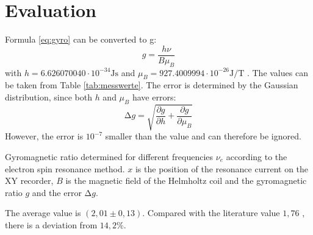 \section{Evaluation}
Formula \ref{eq:gyro} can be converted to g:
\begin{equation}
  g=\frac{h\nu}{B\mu_{B}}
\end{equation}
with $h=6.626070040\cdot10^{-34}\si{\joule\second}$ \cite{3} and $\mu_B=927.4009994\cdot10^{-26}\si{\joule\per\tesla}$ \cite{2}.
The values can be taken from Table \ref{tab:messwerte}.
The error is determined by the Gaussian distribution, since both $h$ and $\mu_B$ have errors:
\begin{equation}
  \increment g = \sqrt{\frac{\partial g}{\partial h}+\frac{\partial g}{\partial \mu_B}}
\end{equation}
However, the error is $10^{-7}$ smaller than the value and can therefore be ignored.
\begin{table}
  \centering
  \caption{Gyromagnetic ratio determined for different frequencies $\nu_e$ according to the electron spin resonance method.
  $x$ is the position of the resonance current on the XY recorder,
  $B$ is the magnetic field of the Helmholtz coil and the gyromagnetic ratio $g$ and the error $\increment g$.}
  \label{tab:messwerte}
\end{table}
The average value is $(2,01\pm0,13)$. Compared with the literature value $1,76$ \cite{4}, there is a deviation from $14,2\%$.

